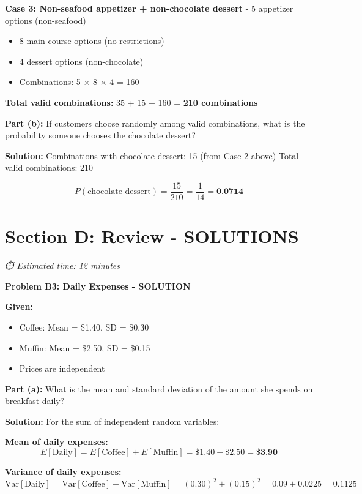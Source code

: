 \documentclass[
  11pt,
]{article}
\begin{document}
\textbf{Case 3: Non-seafood appetizer + non-chocolate dessert} - 5
appetizer options (non-seafood)

\begin{itemize}
\item
  8 main course options (no restrictions)
\item
  4 dessert options (non-chocolate)
\item
  Combinations: 5 × 8 × 4 = 160
\end{itemize}

\textbf{Total valid combinations:} 35 + 15 + 160 = \textbf{210
combinations}

\textbf{Part (b):} If customers choose randomly among valid
combinations, what is the probability someone chooses the chocolate
dessert?

\textbf{Solution:} Combinations with chocolate dessert: 15 (from Case 2
above) Total valid combinations: 210

\[P(\text{chocolate dessert}) = \frac{15}{210} = \frac{1}{14} = \textbf{0.0714}\]

\section{Section D: Review -
SOLUTIONS}\label{section-d-review---solutions}

\emph{⏱️ Estimated time: 12 minutes}

\textbf{Problem B3: Daily Expenses - SOLUTION}

\textbf{Given:}

\begin{itemize}
\item
  Coffee: Mean = \$1.40, SD = \$0.30
\item
  Muffin: Mean = \$2.50, SD = \$0.15
\item
  Prices are independent
\end{itemize}

\textbf{Part (a):} What is the mean and standard deviation of the amount
she spends on breakfast daily?

\textbf{Solution:} For the sum of independent random variables:

\textbf{Mean of daily expenses:}
\[E[\text{Daily}] = E[\text{Coffee}] + E[\text{Muffin}] = \$1.40 + \$2.50 = \textbf{\$3.90}\]

\textbf{Variance of daily expenses:}
\[\text{Var}[\text{Daily}] = \text{Var}[\text{Coffee}] + \text{Var}[\text{Muffin}] = (0.30)^2 + (0.15)^2 = 0.09 + 0.0225 = 0.1125\]
\end{document}
